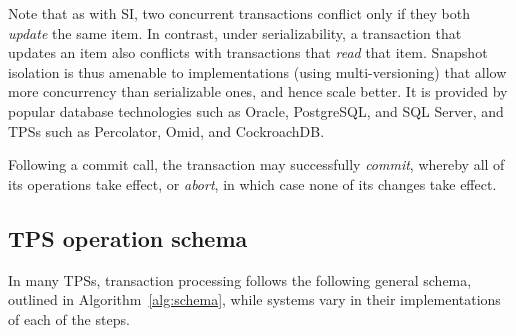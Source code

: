  
Note that as with SI, two concurrent transactions conflict only if they both \emph{update} the same item.  
In contrast, under serializability, a transaction that updates an item also conflicts with transactions that \emph{read} that item. 
Snapshot isolation is thus amenable to implementations (using multi-versioning) that 
allow more concurrency than serializable ones, and hence scale better.
It is provided by popular database technologies such as Oracle, PostgreSQL, and SQL Server,
and TPSs such as Percolator, Omid, and  CockroachDB.

Following a commit call, the transaction may successfully \emph{commit}, whereby all of its operations take effect, 
or 
\emph{abort}, in which case none of its changes take effect. 








\subsection{TPS operation schema}
\label{ssec:schema}


In many TPSs, transaction processing follows the following general schema, outlined in Algorithm~\ref{alg:schema}, while systems vary in their implementations of each of the steps.

